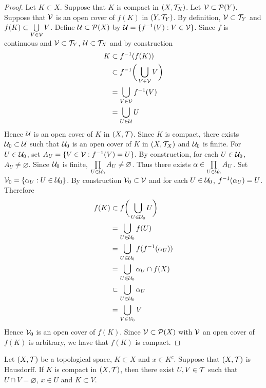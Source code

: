 \documentclass{book}
\begin{document}
	\begin{proof}
		Let $K \subset X$. Suppose that $K$ is compact in $(X, \mathcal{T}_X)$. Let $\mathcal{V} \subset \mathcal{P}(Y)$. Suppose that $\mathcal{V}$ is an open cover of $f(K)$ in $(Y, \mathcal{T}_Y)$. By definition, $\mathcal{V} \subset \mathcal{T}_Y$ and $f(K) \subset \bigcup\limits_{V \in \mathcal{V}} V$. Define $\mathcal{U} \subset \mathcal{P}(X)$ by $\mathcal{U} = \{f^{-1}(V):V \in \mathcal{V}\}$. Since $f$ is continuous and $\mathcal{V} \subset \mathcal{T}_Y$, $\mathcal{U} \subset \mathcal{T}_X$ and by construction
		\begin{align*}
			K
			& \subset f^{-1}(f(K)) \\
			& \subset f^{-1}\bigg( \bigcup\limits_{V \in \mathcal{V}} V \bigg) \\
			& = \bigcup\limits_{V \in \mathcal{V}} f^{-1}(V) \\
			& = \bigcup\limits_{U \in \mathcal{U}} U \\
		\end{align*}
		Hence $\mathcal{U}$ is an open cover of $K$ in $(X, \mathcal{T})$. Since $K$ is compact, there exists $\mathcal{U}_0 \subset \mathcal{U}$ such that $\mathcal{U}_0$ is an open cover of $K$ in $(X, \mathcal{T}_X)$ and $\mathcal{U}_0$ is finite. For $U \in \mathcal{U}_0$, set $A_U = \{V \in \mathcal{V}: f^{-1}(V) = U \}$. By construction, for each $U \in \mathcal{U}_0$, $A_U \neq \varnothing$. Since $\mathcal{U}_0$ is finite, $\prod\limits_{U \in \mathcal{U}_0} A_U \neq \varnothing$. Thus there exists $\alpha \in \prod\limits_{U \in \mathcal{U}_0} A_U$. Set $\mathcal{V}_0 = \{\alpha_U: U \in \mathcal{U}_0\}$. By construction $\mathcal{V}_0 \subset \mathcal{V}$ and for each $U \in \mathcal{U}_0$, $f^{-1}(\alpha_U) = U$. Therefore 
		\begin{align*}
			f(K)
			& \subset f \bigg( \bigcup\limits_{U \in \mathcal{U}_0} U \bigg) \\
			& = \bigcup\limits_{U \in \mathcal{U}_0} f(U) \\
			& = \bigcup\limits_{U \in \mathcal{U}_0} f (f^{-1}(\alpha_U)) \\
			& = \bigcup\limits_{U \in \mathcal{U}_0} \alpha_U \cap f(X) \\
			& \subset \bigcup\limits_{U \in \mathcal{U}_0} \alpha_U \\
			& = \bigcup\limits_{V \in \mathcal{V}_0} V \\
		\end{align*}
		Hence $\mathcal{V}_0$ is an open cover of $f(K)$. Since $\mathcal{V} \subset \mathcal{P}(X)$ with $\mathcal{V}$ an open cover of $f(K)$ is arbitrary, we have that $f(K)$ is compact.
	\end{proof}
	
	\begin{ex} 
		Let $(X, \mathcal{T})$ be a topological space, $K \subset X$ and $x \in K^c$. Suppose that $(X, \mathcal{T})$ is Hausdorff. If $K$ is compact in $(X, \mathcal{T})$, then there exist $U, V \in \mathcal{T}$ such that $U \cap V = \varnothing$, $x \in U$ and $K \subset V$.
	\end{ex}
\end{document}
